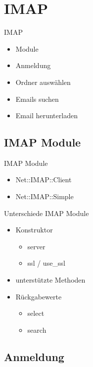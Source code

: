\section{IMAP}

\begin{frame}{IMAP}
  \begin{itemize}
  \item Module
  \item Anmeldung
  \item Ordner auswählen
  \item Emails suchen
  \item Email herunterladen
  \end{itemize}
\end{frame}

\subsection{IMAP Module}

\begin{frame}{IMAP Module}
  \begin{itemize}
  \item Net::IMAP::Client
  \item Net::IMAP::Simple
  \end{itemize}
\end{frame}

\begin{frame}[fragile]{Unterschiede IMAP Module}
  \begin{itemize}
  \item Konstruktor
    \begin{itemize}
      \item server
      \item ssl / use\_ssl
    \end{itemize}
  \item unterstützte Methoden
  \item Rückgabewerte
    \begin{itemize}
    \item select
      \item search
    \end{itemize}
  \end{itemize}
\end{frame}

\subsection{Anmeldung}


